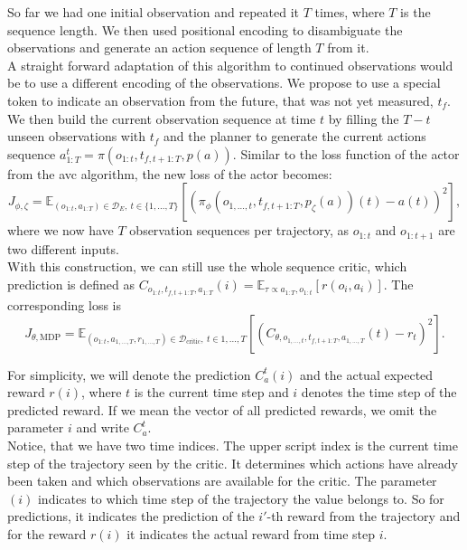 So far we had one initial observation and repeated it $T$ times, where $T$ is the sequence length. We then used positional encoding to disambiguate the observations and generate an action sequence of 
length $T$ from it.\\ 

A straight forward adaptation of this algorithm to continued observations would be to use a different encoding of the observations. We propose to use a special token to indicate an 
observation from the future, that was not yet measured, $t_f$. We then build the current observation sequence at time $t$ by filling the $T - t$ unseen observations with $t_f$ and 
the planner to 
generate the current actions sequence $a^t_{1:T} = \pi(o_{1:t}, t_{f, t+1:T}, p(a))$. Similar to the loss function of the actor from the \ac{avc} algorithm, the new loss of the actor becomes: 
\begin{equation}
    \label{dense_actor_objective}
    J_{\phi, \zeta} = \mathbb{E}_{(o_{1:t}, a_{1:T}) \in \mathcal{D}_E,\ t \in \{1, ..., T\}}\left[\left( \pi_{\phi}(o_{1, ..., t}, t_{f, t+1:T}, p_{\zeta}(a))(t) - a(t)\right)^2\right],
\end{equation}
where we now have $T$ observation sequences per trajectory, as $o_{1:t}$ and $o_{1:t+1}$ are two different inputs.\\
With this construction, we can still use the whole sequence critic, 
which prediction is defined as $C_{o_{1:t}, t_{f, t+1:T}, a_{1:T}}(i) = \mathbb{E}_{\tau \propto a_{1:T}, o_{1:t}}\left[r(o_i, a_i)\right]$. The corresponding loss is
\begin{equation}
    \label{eq:dense_critic_loss}
    J_{\theta, \mathrm{MDP}} = \mathbb{E}_{(o_{1:t}, a_{1,...,T}, r_{1,...,T}) \in \mathcal{D}_{\text{critic}},\ t \in {1, ..., T}}\left[(C_{\theta, o_{1, ..., t}, t_{f, t+1:T},  a_{1,...,T}}(t) - r_t)^2\right].
\end{equation}

For simplicity, we will denote the prediction 
$C_a^t(i)$ and the actual expected reward $r(i)$, where $t$ is the current time step and $i$ denotes the time step of the predicted reward. If we mean the vector of all predicted rewards, we omit the 
parameter $i$ and write $C_a^t$.\\ 

Notice, that we have two time indices. The upper script index is the current time step of the trajectory seen by the critic. 
It determines which actions have already been taken and 
which observations are available for the critic. The parameter $(i)$ indicates to which time step of the trajectory the value belongs to. So for predictions, it indicates the prediction of the $i'$-th 
reward from the trajectory and for the reward $r(i)$ it indicates the actual reward from time step $i$.\\ 

